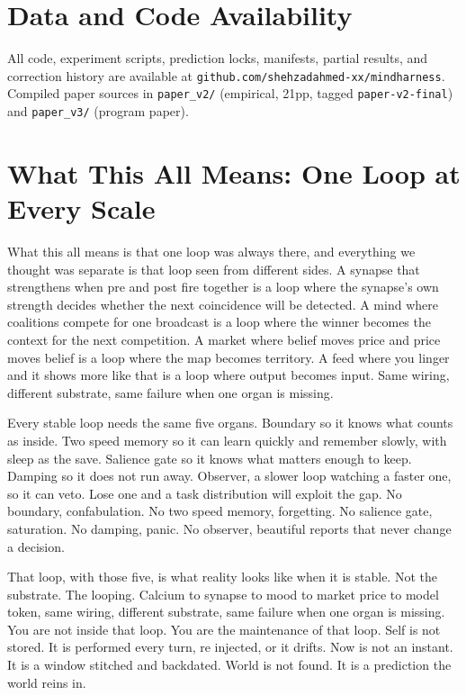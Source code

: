\documentclass[11pt]{article}
\begin{document}
\section*{Data and Code Availability}
All code, experiment scripts, prediction locks, manifests, partial
results, and correction history are available at
\texttt{github.com/\allowbreak{}shehzadahmed-\allowbreak{}xx/\allowbreak{}mindharness}. Compiled paper sources
in \texttt{paper\_v2/} (empirical, 21pp, tagged \texttt{paper-\allowbreak{}v2-\allowbreak{}final})
and \texttt{paper\_v3/} (program paper).


\section{What This All Means: One Loop at Every Scale}
\label{sec:whatthismeans}

What this all means is that one loop was always there, and everything we thought was separate is that loop seen from different sides. A synapse that strengthens when pre and post fire together is a loop where the synapse's own strength decides whether the next coincidence will be detected. A mind where coalitions compete for one broadcast is a loop where the winner becomes the context for the next competition. A market where belief moves price and price moves belief is a loop where the map becomes territory. A feed where you linger and it shows more like that is a loop where output becomes input. Same wiring, different substrate, same failure when one organ is missing.

Every stable loop needs the same five organs. Boundary so it knows what counts as inside. Two speed memory so it can learn quickly and remember slowly, with sleep as the save. Salience gate so it knows what matters enough to keep. Damping so it does not run away. Observer, a slower loop watching a faster one, so it can veto. Lose one and a task distribution will exploit the gap. No boundary, confabulation. No two speed memory, forgetting. No salience gate, saturation. No damping, panic. No observer, beautiful reports that never change a decision.

That loop, with those five, is what reality looks like when it is stable. Not the substrate. The looping. Calcium to synapse to mood to market price to model token, same wiring, different substrate, same failure when one organ is missing. You are not inside that loop. You are the maintenance of that loop. Self is not stored. It is performed every turn, re injected, or it drifts. Now is not an instant. It is a window stitched and backdated. World is not found. It is a prediction the world reins in.
\end{document}
